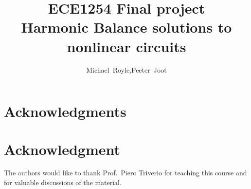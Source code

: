 \documentclass[12pt,journal,compsoc]{../ieeepaper/IEEEtran}
\begin{document}
\title{ECE1254 Final project \\
Harmonic Balance solutions to nonlinear circuits
}

\author{Michael~Royle,Peeter~Joot}


\maketitle

\IEEEdisplaynontitleabstractindextext
\IEEEpeerreviewmaketitle





\ifCLASSOPTIONcompsoc
  \section*{Acknowledgments}
\else
  \section*{Acknowledgment}
\fi


The authors would like to thank Prof.\ Piero Triverio for teaching this course and for valuable discussions of the material.

\ifCLASSOPTIONcaptionsoff
  \newpage
\fi


\label{app:bibliography}



\end{document}
